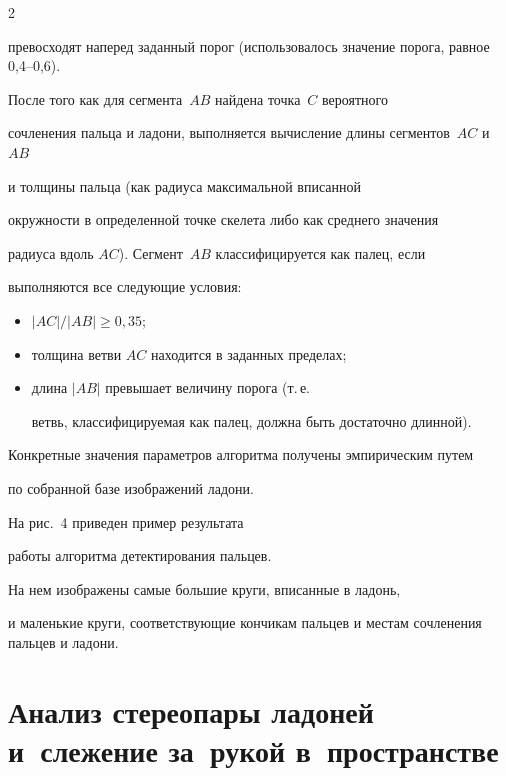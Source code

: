 \begin{multicols}{2}
\begin{itemize}
превосходят наперед заданный порог (использовалось значение порога, рав\-ное 0,4--0,6).


\end{itemize}





После того как для сегмента~$AB$ найдена точка~$C$ вероятного


сочленения пальца и ладони, выполняется вычисление длины сегментов~$AC$ и~$AB$ 


и толщины пальца (как радиуса максимальной вписанной


окружности в определенной точке скелета либо как среднего значения


радиуса вдоль $AC$). Сегмент~$AB$ классифицируется как палец, если


выполняются все следующие условия:


\begin{itemize}


\item $|AC| / |AB| \ge 0{,}35$;


\item толщина ветви $AC$ находится в заданных пределах;


\item длина $|AB|$ превышает величину порога (т.\,е.\ 


ветвь, классифицируемая как палец, должна быть достаточно длинной).


\end{itemize}





Конкретные значения параметров алгоритма получены эмпирическим путем 


по собранной базе изображений ладони.





На рис.~4 приведен пример результата 


работы алгоритма детектирования пальцев.


На нем изображены самые большие круги, вписанные в ладонь,


и маленькие круги, соответствующие кончикам пальцев и местам сочленения пальцев и ладони.








\section{Анализ стереопары ладоней и~слежение за~рукой в~пространстве}\label{sec:HandTracking3D}






\end{multicols}
